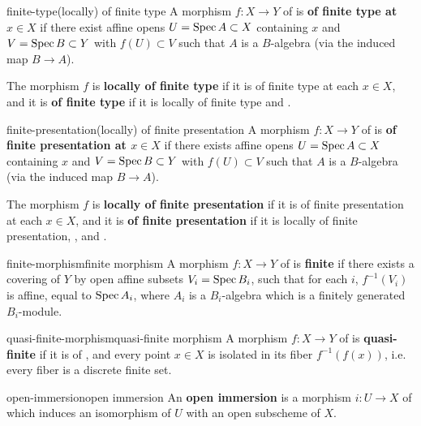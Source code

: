 \begin{topic}{finite-type}{(locally) of finite type}
    A morphism $f : X \to Y$ of  is \textbf{of finite type at $x \in X$} if there exist affine opens $U = \operatorname{Spec} A \subset X$ containing $x$ and $V = \operatorname{Spec} B \subset Y$ with $f(U) \subset V$ such that $A$ is a  $B$-algebra (via the induced map $B \to A$).
    
    The morphism $f$ is \textbf{locally of finite type} if it is of finite type at each $x \in X$, and it is \textbf{of finite type} if it is locally of finite type and .
\end{topic}

\begin{topic}{finite-presentation}{(locally) of finite presentation}
    A morphism $f : X \to Y$ of  is \textbf{of finite presentation at $x \in X$} if there exists affine opens $U = \operatorname{Spec} A \subset X$ containing $x$ and $V = \operatorname{Spec} B \subset Y$ with $f(U) \subset V$ such that $A$ is a  $B$-algebra (via the induced map $B \to A$).
    
    The morphism $f$ is \textbf{locally of finite presentation} if it is of finite presentation at each $x \in X$, and it is \textbf{of finite presentation} if it is locally of finite presentation, , and .
\end{topic}

\begin{topic}{finite-morphism}{finite morphism}
    A morphism $f : X \to Y$ of  is \textbf{finite} if there exists a covering of $Y$ by open affine subsets $V_i = \operatorname{Spec} B_i$, such that for each $i$, $f^{-1}(V_i)$ is affine, equal to $\operatorname{Spec} A_i$, where $A_i$ is a $B_i$-algebra which is a finitely generated $B_i$-module.
\end{topic}

\begin{topic}{quasi-finite-morphism}{quasi-finite morphism}
    A morphism $f : X \to Y$ of  is \textbf{quasi-finite} if it is of , and every point $x \in X$ is isolated in its fiber $f^{-1}(f(x))$, i.e. every fiber is a discrete finite set.
\end{topic}

\begin{topic}{open-immersion}{open immersion}
    An \textbf{open immersion} is a morphism $i : U \to X$ of  which induces an isomorphism of $U$ with an open subscheme of $X$.
\end{topic}


